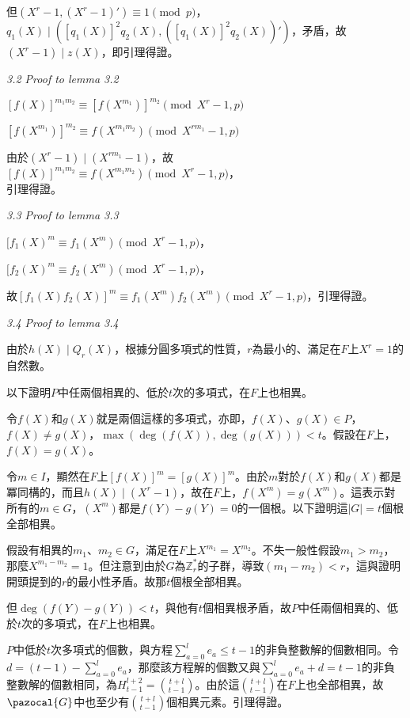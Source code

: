 \documentclass{article}
\newcommand{\Gc}{\pazocal{G}}
\begin{document}
        但$(X^r-1,(X^r-1)')\equiv 1\pmod{p}$，$q_1(X)\mid([q_1(X)]^2q_2(X), ([q_1(X)]^2q_2(X))')$，矛盾，故$(X^r-1)\mid z(X)$，即引理得證。

 \vspace{12pt} 

\noindent\textit{3.2 Proof to lemma 3.2}

    $[f(X)]^{m_1m_2}\equiv [f(X^{m_1})]^{m_2}\pmod{X^r-1,p}$

    $[f(X^{m_1})]^{m_2}\equiv f(X^{m_1m_2})\pmod{X^{rm_1}-1,p}$

    由於$(X^r-1)\mid(X^{rm_1}-1)$，故\\
    $[f(X)]^{m_1m_2}\equiv f(X^{m_1m_2})\pmod{X^r-1,p}$，\\
    引理得證。

 \vspace{12pt} 

\noindent\textit{3.3 Proof to lemma 3.3}

    $[f_1(X)^m\equiv f_1(X^m)\pmod{X^r-1,p}$，

    $[f_2(X)^m\equiv f_2(X^m)\pmod{X^r-1,p}$，
    
    故$[f_1(X)f_2(X)]^m\equiv f_1(X^m)f_2(X^m)\pmod{X^r-1,p}$，引理得證。

 \vspace{12pt} 

\noindent\textit{3.4 Proof to lemma 3.4}

    由於$h(X)\mid Q_r(X)$，根據分圓多項式的性質，$r$為最小的、滿足在$F$上$X^r=1$的自然數。

    以下證明$P$中任兩個相異的、低於$t$次的多項式，在$F$上也相異。

    令$f(X)$和$g(X)$就是兩個這樣的多項式，亦即，$f(X)$、$g(X)\in P$，$f(X)\neq g(X)$，$\max(\deg(f(X)),\deg(g(X)))<t$。假設在$F$上，$f(X)=g(X)$。

    令$m\in I$，顯然在$F$上$[f(X)]^m=[g(X)]^m$。由於$m$對於$f(X)$和$g(X)$都是冪同構的，而且$h(X)\mid (X^r-1)$，故在$F$上，$f(X^m)=g(X^m)$。這表示對所有的$m\in G$，$(X^m)$都是$f(Y)-g(Y)=0$的一個根。以下證明這$|G|=t$個根全部相異。
    
    假設有相異的$m_1$、$m_2\in G$，滿足在$F$上$X^{m_1}=X^{m_2}$。不失一般性假設$m_1>m_2$，那麼$X^{m_1-m_2}=1$。但注意到由於$G$為$\mathbb{Z}_r^*$的子群，導致$(m_1-m_2)<r$，這與證明開頭提到的$r$的最小性矛盾。故那$t$個根全部相異。

    但$\deg(f(Y)-g(Y))<t$，與他有$t$個相異根矛盾，故$P$中任兩個相異的、低於$t$次的多項式，在$F$上也相異。

    $P$中低於$t$次多項式的個數，與方程$\sum\limits_{a=0}^{l}e_a\leq t-1$的非負整數解的個數相同。令$d=(t-1)-\sum\limits_{a=0}^{l}e_a$，那麼該方程解的個數又與$\sum\limits_{a=0}^{l}e_a+d=t-1$的非負整數解的個數相同，為$H_{t-1}^{l+2}=\binom{t+l}{t-1}$。由於這$\binom{t+l}{t-1}$在$F$上也全部相異，故$\Gc$中也至少有$\binom{t+l}{t-1}$個相異元素。引理得證。
\end{document}
